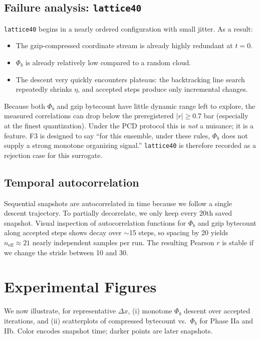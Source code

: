 \documentclass[11pt,a4paper]{article}
\newcommand{\phib}{\Phi_b}
\begin{document}
\subsection*{Failure analysis: \texttt{lattice40}}
\texttt{lattice40} begins in a nearly ordered configuration with small jitter. As a result:

\begin{itemize}
\item The gzip-compressed coordinate stream is already highly redundant at $t{=}0$.
\item $\phib$ is already relatively low compared to a random cloud.
\item The descent very quickly encounters plateaus: the backtracking line search repeatedly shrinks $\eta$, and accepted steps produce only incremental changes.
\end{itemize}

Because both $\phib$ and gzip bytecount have little dynamic range left to explore, the measured correlations can drop below the preregistered $|r|\ge 0.7$ bar (especially at the finest quantization). Under the PCD protocol this is \emph{not} a nuisance; it is a feature. F3 is designed to say “for this ensemble, under these rules, $\phib$ does not supply a strong monotone organizing signal.” \texttt{lattice40} is therefore recorded as a rejection case for this surrogate.

\subsection*{Temporal autocorrelation}
Sequential snapshots are autocorrelated in time because we follow a single descent trajectory. To partially decorrelate, we only keep every 20th saved snapshot. Visual inspection of autocorrelation functions for $\phib$ and gzip bytecount along accepted steps shows decay over $\sim$15 steps, so spacing by 20 yields $n_{\text{eff}}\approx 21$ nearly independent samples per run. The resulting Pearson $r$ is stable if we change the stride between 10 and 30.

\section{Experimental Figures}
We now illustrate, for representative $\Delta x$, (i) monotone $\phib$ descent over accepted iterations, and (ii) scatterplots of compressed bytecount vs.\ $\phib$ for Phase IIa and IIb. Color encodes snapshot time; darker points are later snapshots.
\end{document}
